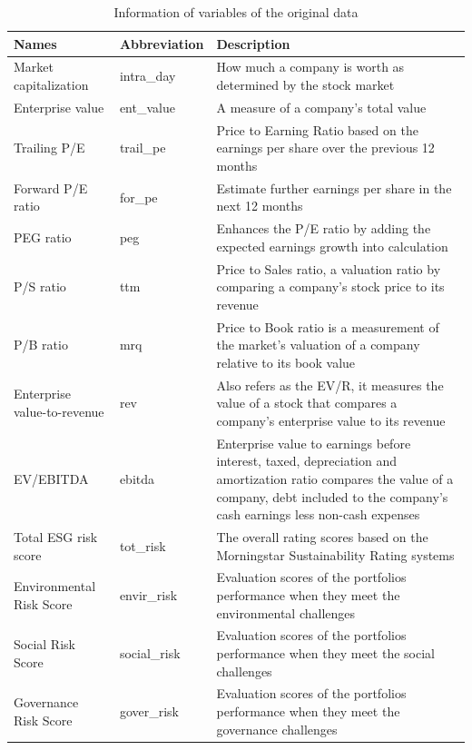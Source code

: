 \documentclass[11pt,a4paper,]{article}
\begin{document}
\begin{table}

\caption{\label{tab:variables-table}Information of variables of the original data}
\centering
\begin{tabular}[t]{l|l|>{\raggedright\arraybackslash}p{150px}}
\hline
Names & Abbreviation & Description\\
\hline
Market capitalization & intra\_day & How much a company is worth as determined by the stock market\\
\hline
Enterprise value & ent\_value & A measure of a company's total value\\
\hline
Trailing P/E & trail\_pe & Price to Earning Ratio based on the earnings per share over the previous 12 months\\
\hline
Forward P/E ratio & for\_pe & Estimate further earnings per share in the next 12 months\\
\hline
PEG ratio & peg & Enhances the P/E ratio by adding the expected earnings growth into calculation\\
\hline
P/S ratio & ttm & Price to Sales ratio, a valuation ratio by comparing a company’s stock price to its revenue\\
\hline
P/B ratio & mrq & Price to Book ratio is a measurement of the market's valuation of a company relative to its book value\\
\hline
Enterprise value-to-revenue & rev & Also refers as the EV/R, it measures the value of a stock that compares a company's enterprise value to its revenue\\
\hline
EV/EBITDA & ebitda & Enterprise value to earnings before interest, taxed, depreciation and amortization ratio compares the value of a company, debt included to the company's cash earnings less non-cash expenses\\
\hline
Total ESG risk score & tot\_risk & The overall rating scores based on the Morningstar Sustainability Rating systems\\
\hline
Environmental Risk Score & envir\_risk & Evaluation scores of the portfolios performance when they meet the environmental challenges\\
\hline
Social Risk Score & social\_risk & Evaluation scores of the portfolios performance when they meet the social challenges\\
\hline
Governance Risk Score & gover\_risk & Evaluation scores of the portfolios performance when they meet the governance challenges\\
\hline
\end{tabular}
\end{table}
\end{document}
